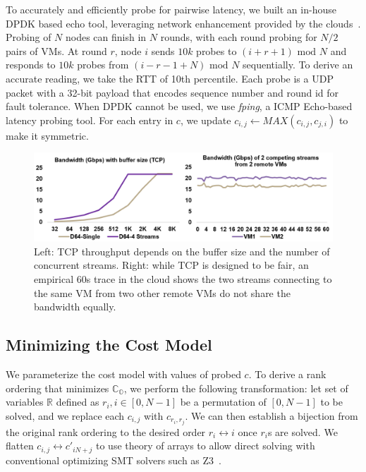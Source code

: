 To accurately and efficiently probe for pairwise latency, we built an in-house DPDK based echo tool, leveraging network enhancement provided by the clouds~\cite{Createan37:online, Enablean80:online}. Probing of $N$ nodes can finish in $N$ rounds, with each round probing for $N/2$ pairs of VMs. At round $r$, node $i$ sends $10k$ probes to $(i + r + 1) \text{ mod } N$ and responds to $10k$ probes from $(i - r - 1 + N) \text{ mod } N$ sequentially. To derive an accurate reading, we take the RTT of 10th percentile. Each probe is a UDP packet with a 32-bit payload that encodes sequence number and round id for fault tolerance. When DPDK cannot be used, we use \textit{fping}, a ICMP Echo-based latency probing tool. For each entry in $c$, we update $c_{i,j} \leftarrow MAX(c_{i,j}, c_{j,i})$ to make it symmetric.


\begin{figure}[t!]
    \centering
    \includegraphics[width=.7\linewidth]{Figures/tcpchartacteristics.png}
    \caption{Left: TCP throughput depends on the buffer size and the number of concurrent streams. Right: while TCP is designed to be fair, an empirical 60s trace in the cloud shows the two streams connecting to the same VM from two other remote VMs do not share the bandwidth equally.}
    \label{fig:tcpchartacteristics}
\end{figure}



\subsection{Minimizing the Cost Model}
We parameterize the cost model with values of probed $c$. To derive a rank ordering that minimizes $\mathbb{C_O}$, we perform the following transformation: let set of variables $\mathbb{R}$ defined as $r_i, i \in [0,N-1]$ be a permutation of $[0,N-1]$ to be solved, and we replace each $c_{i,j}$ with $c_{r_i,r_j}$. We can then establish a bijection from the original rank ordering to the desired order $r_i \leftrightarrow i$ once $r_i$s are solved. We flatten $c_{i,j} \leftrightarrow c'_{iN + j}$ to use theory of arrays to allow direct solving with conventional optimizing SMT solvers such as Z3~\cite{de2008z3,ORToolsG24:online}. 

